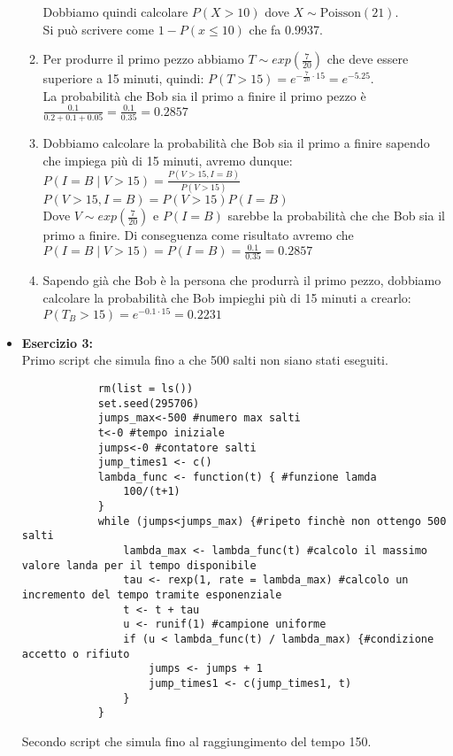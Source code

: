\documentclass[a4paper,12pt]{article}
\begin{document}
\begin{itemize}
\begin{enumerate}[label=\alph*)]
			Dobbiamo quindi calcolare $P(X > 10)$ dove $X \sim \text{Poisson}(21)$.\\
			Si può scrivere come $1-P(x\leq10)$ che fa 0.9937.\\
			\item Per produrre il primo pezzo abbiamo $T\sim exp(\frac{7}{20})$ che deve essere superiore a 15 minuti, quindi: $P(T > 15)=e^{-\frac{7}{20}\cdot15}=e^{-5.25}.$\\
			La probabilità che Bob sia il primo a finire il primo pezzo è $\frac{0.1}{0.2+0.1+0.05}=\frac{0.1}{0.35}=0.2857$
			\item Dobbiamo calcolare la probabilità che Bob sia il primo a finire sapendo che impiega più di 15 minuti, avremo dunque:\\
			$P(I=B\mid V>15) = \frac{P(V > 15, I = B)}{P(V>15)}$\\
			$P(V > 15, I = B) = P(V > 15)P(I = B)$\\
			Dove $V\sim exp(\frac{7}{20})$ e $P(I=B)$ sarebbe la probabilità che che Bob sia il primo a finire. Di conseguenza come risultato avremo che $P(I=B\mid V>15) =P(I = B)=\frac{0.1}{0.35}=0.2857$
			\item Sapendo già che Bob è la persona che produrrà il primo pezzo, dobbiamo calcolare la probabilità che Bob impieghi più di 15 minuti a crearlo:\\
			$P(T_B>15)=e^{-0.1\cdot15}=0.2231$
		\end{enumerate}
		\newpage
		\item \textbf{Esercizio 3: }\\
		Primo script che simula fino a che 500 salti non siano stati eseguiti.
		\begin{verbatim}
			rm(list = ls())
			set.seed(295706) 
			jumps_max<-500 #numero max salti
			t<-0 #tempo iniziale
			jumps<-0 #contatore salti
			jump_times1 <- c()
			lambda_func <- function(t) { #funzione lamda
				100/(t+1)
			}
			while (jumps<jumps_max) {#ripeto finchè non ottengo 500 salti
				lambda_max <- lambda_func(t) #calcolo il massimo valore landa per il tempo disponibile
				tau <- rexp(1, rate = lambda_max) #calcolo un incremento del tempo tramite esponenziale
				t <- t + tau
				u <- runif(1) #campione uniforme
				if (u < lambda_func(t) / lambda_max) {#condizione accetto o rifiuto
					jumps <- jumps + 1
					jump_times1 <- c(jump_times1, t)
				}
			}
		\end{verbatim}
		Secondo script che simula fino al raggiungimento del tempo 150.\\
		\begin{verbatim}

\end{verbatim}
\end{itemize}
\end{document}
